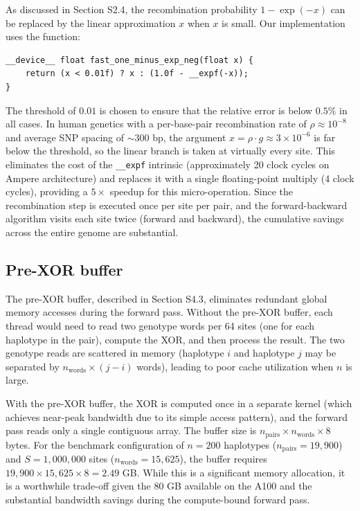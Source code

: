 \documentclass[10pt,letterpaper]{article}
\begin{document}
As discussed in Section S2.4, the recombination probability $1 - \exp(-x)$ can be replaced by the linear approximation $x$ when $x$ is small. Our implementation uses the function:
\begin{verbatim}
__device__ float fast_one_minus_exp_neg(float x) {
    return (x < 0.01f) ? x : (1.0f - __expf(-x));
}
\end{verbatim}
The threshold of $0.01$ is chosen to ensure that the relative error is below $0.5\%$ in all cases. In human genetics with a per-base-pair recombination rate of $\rho \approx 10^{-8}$ and average SNP spacing of $\sim\!300$ bp, the argument $x = \rho \cdot g \approx 3 \times 10^{-6}$ is far below the threshold, so the linear branch is taken at virtually every site. This eliminates the cost of the \texttt{\_\_expf} intrinsic (approximately 20 clock cycles on Ampere architecture) and replaces it with a single floating-point multiply (4 clock cycles), providing a $5\times$ speedup for this micro-operation. Since the recombination step is executed once per site per pair, and the forward-backward algorithm visits each site twice (forward and backward), the cumulative savings across the entire genome are substantial.

\subsection{Pre-XOR buffer}

The pre-XOR buffer, described in Section S4.3, eliminates redundant global memory accesses during the forward pass. Without the pre-XOR buffer, each thread would need to read two genotype words per 64 sites (one for each haplotype in the pair), compute the XOR, and then process the result. The two genotype reads are scattered in memory (haplotype $i$ and haplotype $j$ may be separated by $n_{\mathrm{words}} \times (j - i)$ words), leading to poor cache utilization when $n$ is large.

With the pre-XOR buffer, the XOR is computed once in a separate kernel (which achieves near-peak bandwidth due to its simple access pattern), and the forward pass reads only a single contiguous array. The buffer size is $n_{\mathrm{pairs}} \times n_{\mathrm{words}} \times 8$ bytes. For the benchmark configuration of $n = 200$ haplotypes ($n_{\mathrm{pairs}} = 19{,}900$) and $S = 1{,}000{,}000$ sites ($n_{\mathrm{words}} = 15{,}625$), the buffer requires $19{,}900 \times 15{,}625 \times 8 = 2.49$ GB. While this is a significant memory allocation, it is a worthwhile trade-off given the 80 GB available on the A100 and the substantial bandwidth savings during the compute-bound forward pass.
\end{document}

